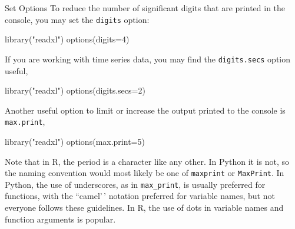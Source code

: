 \documentclass[
  11pt,
  ignorenonframetext,
  svgnames, handout, t]{beamer}
\newenvironment{Shaded}{\begin{snugshade}}{\end{snugshade}}
\newcommand{\AttributeTok}[1]{\textcolor[rgb]{0.77,0.63,0.00}{#1}}
\newcommand{\DecValTok}[1]{\textcolor[rgb]{0.00,0.00,0.81}{#1}}
\newcommand{\FunctionTok}[1]{\textcolor[rgb]{0.00,0.00,0.00}{#1}}
\newcommand{\NormalTok}[1]{#1}
\newcommand{\StringTok}[1]{\textcolor[rgb]{0.31,0.60,0.02}{#1}}
\begin{document}
\begin{frame}[fragile]{Set Options}
\protect\hypertarget{set-options}{}
To reduce the number of significant digits that are printed in the
console, you may set the \texttt{digits} option:

\footnotesize

\begin{Shaded}
\begin{Highlighting}[]
\FunctionTok{library}\NormalTok{(}\StringTok{"readxl"}\NormalTok{)}
\FunctionTok{options}\NormalTok{(}\AttributeTok{digits=}\DecValTok{4}\NormalTok{)}
\end{Highlighting}
\end{Shaded}

\normalsize

If you are working with time series data, you may find the
\texttt{digits.secs} option useful,

\footnotesize

\begin{Shaded}
\begin{Highlighting}[]
\FunctionTok{library}\NormalTok{(}\StringTok{"readxl"}\NormalTok{)}
\FunctionTok{options}\NormalTok{(}\AttributeTok{digits.secs=}\DecValTok{2}\NormalTok{)}
\end{Highlighting}
\end{Shaded}

\normalsize

Another useful option to limit or increase the output printed to the
console is \texttt{max.print},

\footnotesize

\begin{Shaded}
\begin{Highlighting}[]
\FunctionTok{library}\NormalTok{(}\StringTok{"readxl"}\NormalTok{)}
\FunctionTok{options}\NormalTok{(}\AttributeTok{max.print=}\DecValTok{5}\NormalTok{)}
\end{Highlighting}
\end{Shaded}

\normalsize

Note that in R, the period is a character like any other. In Python it
is not, so the naming convention would most likely be one of
\texttt{maxprint} or \texttt{MaxPrint}. In Python, the use of
underscores, as in \texttt{max\_print}, is usually preferred for
functions, with the ``camel'\,' notation preferred for variable names,
but not everyone follows these guidelines. In R, the use of dots in
variable names and function arguments is popular.
\end{frame}
\end{document}
